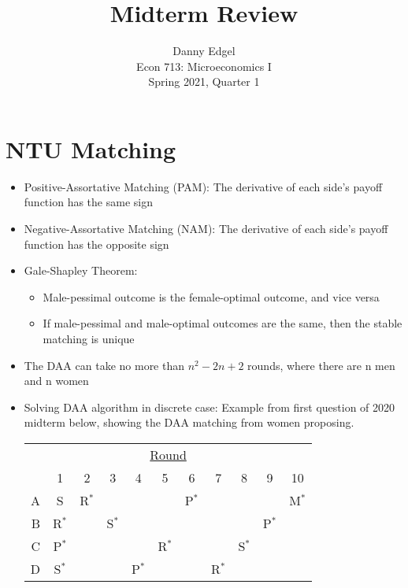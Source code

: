 \documentclass{article}
\begin{document}
\title{	Midterm Review }
\author{ 	Danny Edgel 					\\ 
		Econ 713: Microeconomics I		\\
		Spring 2021, Quarter 1			\\
		}
\maketitle\thispagestyle{empty}




\section*{NTU Matching}

\begin{itemize}
	\item Positive-Assortative Matching (PAM): The derivative of each side’s payoff function has the same sign
	
	\item Negative-Assortative Matching (NAM): The derivative of each side’s payoff function has the opposite sign
	
	\item Gale-Shapley Theorem:
	
	\begin{itemize}
		
		\item Male-pessimal outcome is the female-optimal outcome, and vice versa
		
		\item If male-pessimal and male-optimal outcomes are the same, then the stable matching is unique
	
	\end{itemize}
	
	\item The DAA can take no more than $n^2-2n+2$ rounds, where there are n men and n women
	
	\item Solving DAA algorithm in discrete case: Example from first question of 2020 midterm below, showing the DAA matching from women proposing.
		\begin{center}
			\begin{tabular}{r|c|c|c|c|c|c|c|c|c|c}
			\multicolumn{11}{c}{\underline{Round}} \\ 
			 	& 1 		& 2 		& 3 		& 4 		& 5 		& 6		& 7 		& 8 		& 9 		& 10	\\\hline
			  A 	& S 		& R$^*$	& 		& 		&		& P$^*$	&		&		&		& M$^*$ \\\hline
			  B 	& R$^*$ 	& 		& S$^*$	& 		&		&		&		&		& P$^*$	& \\\hline
			  C 	& P$^*$ 	& 		& 		& 		& R$^*$ 	&		&		& S$^*$	&		& \\\hline
			  D	& S$^*$	& 		& 		& P$^*$	&		&		& R$^*$ 	&		&		& \\\hline
			\end{tabular}
		\end{center}
	
	
\end{itemize}
\end{document}
